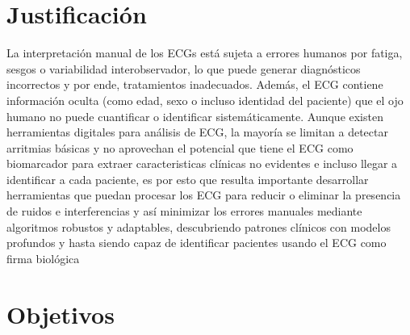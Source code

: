 \documentclass[12pt,letterpaper,oneside,openright]{book}
\begin{document}
\section{Justificación}
	La interpretación manual de los ECGs está sujeta a errores humanos por fatiga, sesgos o variabilidad interobservador, lo que puede generar diagnósticos incorrectos y por ende, tratamientos inadecuados. Además, el ECG contiene información oculta (como edad, sexo o incluso identidad del paciente) que el ojo humano no puede cuantificar o identificar sistemáticamente. Aunque existen herramientas digitales para análisis de ECG, la mayoría se limitan a detectar arritmias básicas y no aprovechan el potencial que tiene el ECG como biomarcador  para extraer caracteristicas clínicas no evidentes e incluso llegar a identificar a cada paciente, es por esto que resulta importante desarrollar herramientas que puedan procesar los ECG para reducir o eliminar la presencia de ruidos e interferencias y así minimizar los errores manuales mediante algoritmos robustos y adaptables, descubriendo patrones clínicos con modelos profundos y hasta siendo capaz de identificar pacientes usando el ECG como firma biológica
	
 

\section{Objetivos}
\end{document}
